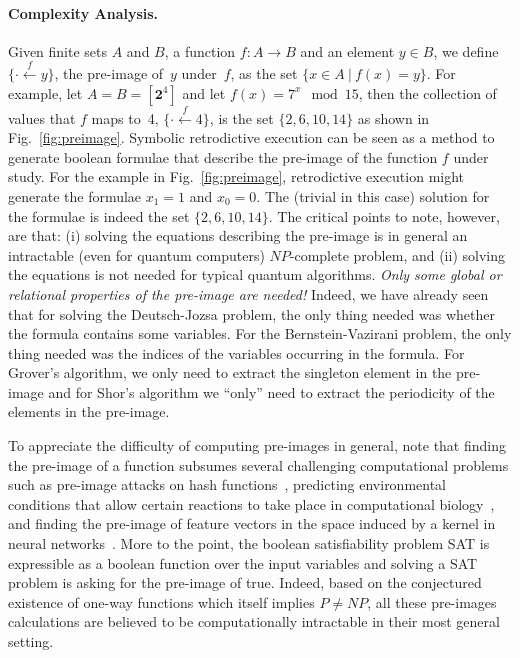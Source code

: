 \documentclass[aps,prl,twocolumn,superscriptaddress,floatfix,notitlepage]{revtex4-2}
\newcommand{\preim}[2]{\{\cdot\stackrel{#1}{\longleftarrow}{#2}\}}
\newcommand{\finset}[1]{[\mathbf{#1}]}
\begin{document}
\paragraph*{Complexity Analysis.}
Given finite sets $A$ and $B$, a function $f : A \rightarrow B$ and an
element $y \in B$, we define $\preim{f}{y}$, the pre-image of~$y$
under~$f$, as the set $\{ x \in A ~|~ f(x) = y \}$. For example, let
$A = B = \finset{2^\mathrm{4}}$ and let $f(x) = 7^x \mod 15$, then the
collection of values that $f$ maps to~4, $\preim{f}{4}$, is the set
$\{ 2, 6, 10, 14 \}$ as shown in Fig.~\ref{fig:preimage}. Symbolic
retrodictive execution can be seen as a method to generate boolean
formulae that describe the pre-image of the function $f$ under
study. For the example in Fig.~\ref{fig:preimage}, retrodictive
execution might generate the formulae $x_1=1$ and $x_0=0$. The
(trivial in this case) solution for the formulae is indeed the set $\{
2, 6, 10, 14 \}$. The critical points to note, however, are that: (i)
solving the equations describing the pre-image is in general an
intractable (even for quantum computers) $\mathit{NP}$-complete
problem, and (ii) solving the equations is not needed for typical
quantum algorithms. \emph{Only some global or relational properties of the pre-image
  are needed!} Indeed, we have already seen that for solving the
Deutsch-Jozsa problem, the only thing needed was whether the formula
contains some variables. For the Bernstein-Vazirani problem, the only
thing needed was the indices of the variables occurring in the
formula. For Grover's algorithm, we only need to extract the singleton
element in the pre-image and for Shor's algorithm we ``only'' need to
extract the periodicity of the elements in the pre-image.

To appreciate the difficulty of computing pre-images in general, note
that finding the pre-image of a function subsumes several challenging
computational problems such as pre-image attacks on hash
functions~\cite{10.1007/978-3-540-25937-4_24}, predicting
environmental conditions that allow certain reactions to take place in
computational biology~\cite{Klotz2013,akutsu2009analyses}, and finding
the pre-image of feature vectors in the space induced by a kernel in
neural networks~\cite{1353287}. More to the point, the boolean
satisfiability problem SAT is expressible as a boolean function over
the input variables and solving a SAT problem is asking for the
pre-image of \textsf{true}. Indeed, based on the conjectured existence
of one-way functions which itself implies $\mathit{P} \neq
\mathit{NP}$, all these pre-images calculations are believed to be
computationally intractable in their most general setting.
\end{document}
